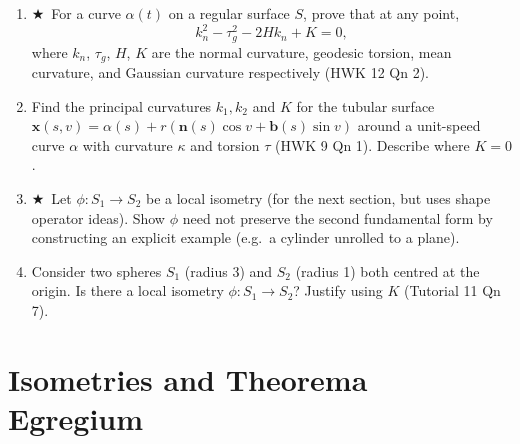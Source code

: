 \documentclass[11pt, a4paper]{article}
\newcommand{\mbf}[1]{\mathbf{#1}}
\newcommand{\kp}{\kappa}
\newcommand{\tp}{\tau}
\newcommand{\hard}{$\bigstar$\ }
\begin{document}
\begin{enumerate}[label=\textbf{Q\arabic*.}, leftmargin=*, itemsep=6pt]
\item \hard For a curve $\alpha(t)$ on a regular surface $S$, prove that at any point,
\[
  k_n^2 - \tau_g^2 - 2Hk_n + K = 0,
\]
where $k_n$, $\tau_g$, $H$, $K$ are the normal curvature, geodesic torsion, mean curvature, and Gaussian curvature respectively (HWK 12 Qn 2).

\item Find the principal curvatures $k_1,k_2$ and $K$ for the tubular surface $\mathbf{x}(s,v)=\alpha(s)+r(\mbf{n}(s)\cos v+\mbf{b}(s)\sin v)$ around a unit-speed curve $\alpha$ with curvature $\kp$ and torsion $\tp$ (HWK 9 Qn 1). Describe where $K=0$.

\item \hard Let $\phi:S_1\to S_2$ be a local isometry (for the next section, but uses shape operator ideas). Show $\phi$ need not preserve the second fundamental form by constructing an explicit example (e.g.\ a cylinder unrolled to a plane).

\item Consider two spheres $S_1$ (radius 3) and $S_2$ (radius 1) both centred at the origin. Is there a local isometry $\phi:S_1\to S_2$? Justify using $K$ (Tutorial 11 Qn 7).

\end{enumerate}

\section{Isometries and Theorema Egregium}
\end{document}
